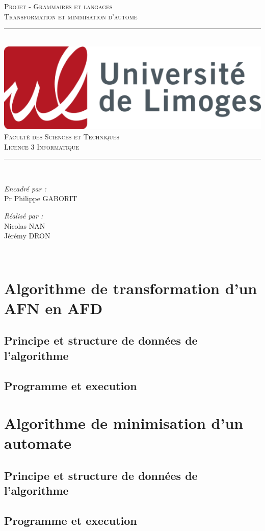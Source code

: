 \documentclass[a4paper]{article}
\begin{document}
\begin{titlepage}
	\centering
    \vspace*{0.5 cm} 
    \textsc{\LARGE Projet - Grammaires et langages}\\[1.0 cm]
    \textsc{\large Transformation et minimisation d'autome}\\[1.0 cm]
	\rule{\linewidth}{0.2 mm} \\[0.4 cm]
	\includegraphics[scale=1]{src/logo.png}\\
	\vspace{0.5cm}
	\textsc{\Large Faculté des Sciences et Techniques}\\[0.2 cm]
	\textsc{\large Licence 3 Informatique }\\
	\rule{\linewidth}{0.2 mm} \\[1.5 cm]
	\begin{minipage}{0.4\textwidth}
	\begin{flushright} \large
		\emph{Encadré par :}\\
		Pr Philippe GABORIT\\
		\end{flushright}
    	\begin{flushright} \large
		\emph{Réalisé par :}\\
		Nicolas NAN\\
		Jérémy DRON \\
		\end{flushright}
	\end{minipage}\\[2 cm]
\end{titlepage}

\section{Algorithme de transformation d'un AFN en AFD}
\subsection{Principe et structure de données de l'algorithme}
\subsection{Programme et execution}


\section{Algorithme de minimisation d'un automate}
\subsection{Principe et structure de données de l'algorithme}
\subsection{Programme et execution}
\end{document}

